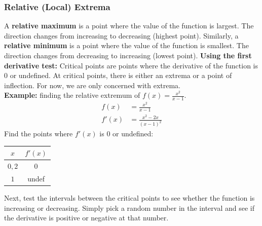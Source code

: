 \documentclass[12pt]{article}
\begin{document}
            \subsubsection{Relative (Local) Extrema}
                A \textbf{relative maximum} is a point where the value of the function is largest. The direction changes from increasing to decreasing (highest point).
                \newline \newline
                Similarly, a \textbf{relative minimum} is a point where the value of the function is smallest. The direction changes from decreasing to increasing (lowest point).
                \newline \newline
                \textbf{Using the first derivative test:}
                \newline
                Critical points are points where the derivative of the function is $0$ or undefined. At critical points, there is either an extrema or a point of inflection. For now, we are only concerned with extrema.
                \\ \textbf{Example:} finding the relative extremum of $f(x) = \frac{x^2}{x-1}$.
                \begin{align*}
                    f(x) &= \frac{x^2}{x-1} \\[6pt]
                    f'(x) &= \frac{x^2-2x}{(x-1)^2}
                \end{align*}
                Find the points where $f'(x)$ is $0$ or undefined:
                \begin{center}
                    \begin{tabular}{|c|c|}
                        \hline
                        $x$ & $f'(x)$ \\
                        \hline \hline
                        $0, 2$ & $0$ \\
                        \hline
                        $1$ & undef \\
                        \hline
                    \end{tabular}
                \end{center}
                Next, test the intervals between the critical points to see whether the function is increasing or decreasing. Simply pick a random number in the interval and see if the derivative is positive or negative at that number.
\end{document}
